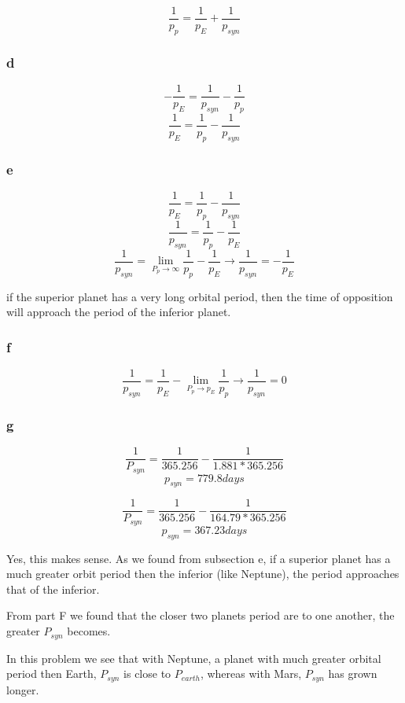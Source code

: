 \documentclass{article}
\begin{document}
\[ \frac{1}{p_p}  =  \frac{1}{p_E} + \frac{1}{p_{syn}}\]

\subsubsection{d}

\[  - \frac{1}{p_E} = \frac{1}{p_{syn}} -  \frac{1}{p_p}\]
\[  \frac{1}{p_E} =  \frac{1}{p_p} - \frac{1}{p_{syn}}\]

\subsubsection{e}

\[  \frac{1}{p_E} =  \frac{1}{p_p}- \frac{1}{p_{syn}}\]
\[\frac{1}{p_{syn}} = \frac{1}{p_p} - \frac{1}{p_E}\]
\[\frac{1}{p_{syn}} = \lim_{P_p \rightarrow \infty} \frac{1}{p_p} - \frac{1}{p_E} \rightarrow \frac{1}{p_{syn}} = - \frac{1}{p_E}\]
\begin{center}
    if the superior planet has a very long orbital period, then the time of opposition will approach the period of the inferior planet.
\end{center}

\subsubsection{f}

\[\frac{1}{p_{syn}} =  \frac{1}{p_E} - \lim_{P_p \rightarrow p_E}\frac{1}{p_p}\rightarrow \frac{1}{p_{syn}} = 0\]


\subsubsection{g}

\[\frac{1}{P_{syn}} = \frac{1}{365.256} - \frac{1}{1.881*365.256}\]
\[p_{syn} = 779.8 days\]

\[\frac{1}{P_{syn}} = \frac{1}{365.256} - \frac{1}{164.79*365.256}\]
\[p_{syn} = 367.23 days\]

Yes, this makes sense. As we found from subsection e, if a superior planet has a much greater orbit period then the inferior (like Neptune), the period approaches that of the inferior.

From part F we found that the closer two planets period are to one another, the greater $P_{syn}$ becomes.

In this problem we see that with Neptune, a planet with much greater orbital period then Earth, $P_{syn}$ is close to $P_{earth}$, whereas with Mars, $P_{syn}$ has grown longer.
\end{document}
